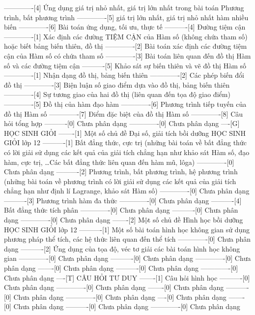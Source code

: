 -------------[4] Ứng dụng giá trị nhỏ nhất, giá trị lớn nhất trong bài toán Phương trình, bất phương trình
-------------[5] giá trị lớn nhất, giá trị nhỏ nhất hàm nhiều biến
-------------[6] Bài toán ứng dụng, tối ưu, thực tế
----------[4] Đường tiệm cận
-------------[1] Xác định các đường TIỆM CẬN của Hàm số (không chứa tham số) hoặc biết bảng biến thiên, đồ thị
-------------[2] Bài toán xác định các đường tiệm cận của Hàm số có chứa tham số
-------------[3] Bài toán liên quan đến đồ thị Hàm số và các đường tiệm cận
----------[5] Khảo sát sự biến thiên và vẽ đồ thị Hàm số
-------------[1] Nhận dạng đồ thị, bảng biến thiên
-------------[2] Các phép biến đổi đồ thị
-------------[3] Biện luận số giao điểm dựa vào đồ thị, bảng biến thiên
-------------[4] Sự tương giao của hai đồ thị (liên quan đến tọa độ giao điểm)
-------------[5] Đồ thị của hàm đạo hàm
-------------[6] Phương trình tiếp tuyến của đồ thị Hàm số
-------------[7] Điểm đặc biệt của đồ thị Hàm số
-------------[8] Câu hỏi tổng hợp
----------[0] Chưa phân dạng
-------------[0] Chưa phân dạng
----[G] HỌC SINH GIỎI
-------[1] Một số chủ đề Đại số, giải tích bồi dưỡng HỌC SINH GIỎI lớp 12
----------[1] Bất đẳng thức, cực trị (những bài toán về bất đẳng thức có lời giải sử dụng các kết quả của giải tích chẳng hạn như khảo sát Hàm số, đạo hàm, cực trị, \ldots Các bất đẳng thức liên quan đến hàm mũ, lôga)
-------------[0] Chưa phân dạng
----------[2] Phương trình, bất phương trình, hệ phương trình (những bài toán về phương trình có lời giải sử dụng các kết quả của giải tích chẳng hạn như định lí Lagrange, khảo sát Hàm số)
-------------[0] Chưa phân dạng
----------[3] Phương trình hàm đa thức
-------------[0] Chưa phân dạng
----------[4] Bất đẳng thức tích phân
-------------[0] Chưa phân dạng
----------[0] Chưa phân dạng
-------------[0] Chưa phân dạng
-------[2] Một số chủ đề Hình học bồi dưỡng HỌC SINH GIỎI lớp 12
----------[1] Một số bài toán hình học không gian sử dụng phương pháp thể tích, các hệ thức liên quan đến thể tích
-------------[0] Chưa phân dạng
----------[2] Ứng dụng của tọa độ, véc tơ giải các bài toán hình học không gian
-------------[0] Chưa phân dạng
----------[0] Chưa phân dạng
-------------[0] Chưa phân dạng
-------[0] Chưa phân dạng
----------[0] Chưa phân dạng
-------------[0] Chưa phân dạng
----[T] CÂU HỎI TƯ DUY
-------[1] Câu hỏi hình học
----------[0] Chưa phân dạng
-------------[0] Chưa phân dạng
-------[0] Chưa phân dạng
----------[0] Chưa phân dạng
-------------[0] Chưa phân dạng
----[0] Chưa phân dạng
-------[0] Chưa phân dạng
----------[0] Chưa phân dạng
-------------[0] Chưa phân dạng
